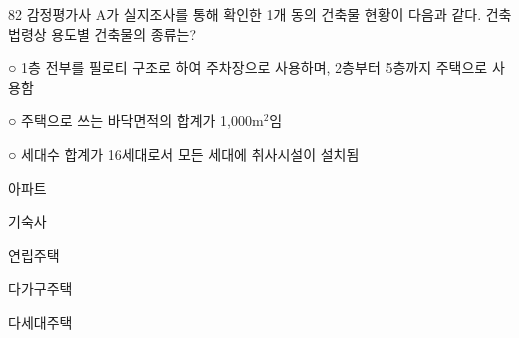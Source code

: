 \begin{question}{82}
감정평가사 A가 실지조사를 통해 확인한 1개 동의 건축물 현황이 다음과 같다. 건축법령상 용도별 건축물의 종류는?
\begin{framedtext}
○ 1층 전부를 필로티 구조로 하여 주차장으로 사용하며, 2층부터 5층까지 주택으로 사용함 \par
○ 주택으로 쓰는 바닥면적의 합계가 1,000m$^2$임 \par
○ 세대수 합계가 16세대로서 모든 세대에 취사시설이 설치됨 \par
\end{framedtext}
\begin{choices}
  \item 아파트
  \item 기숙사
  \item 연립주택
  \item 다가구주택
  \item 다세대주택
\end{choices}
\end{question}
